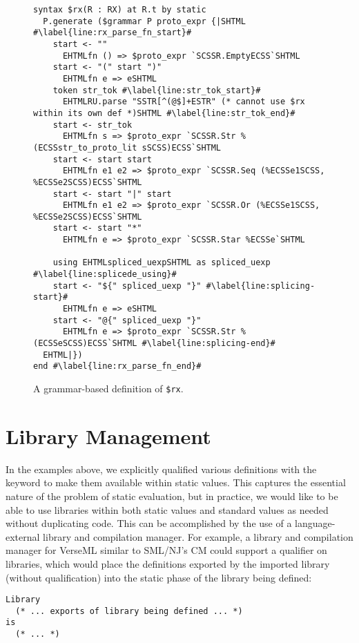 {\begin{figure}[h!]
\vspace{-5px}
\begin{lstlisting}[deletekeywords={as}]
syntax $rx(R : RX) at R.t by static 
  P.generate ($grammar P proto_expr {|SHTML #\label{line:rx_parse_fn_start}#
    start <- ""
      EHTMLfn () => $proto_expr `SCSSR.EmptyECSS`SHTML
    start <- "(" start ")"
      EHTMLfn e => eSHTML
    token str_tok #\label{line:str_tok_start}#
      EHTMLRU.parse "SSTR[^(@$]+ESTR" (* cannot use $rx within its own def *)SHTML #\label{line:str_tok_end}#
    start <- str_tok
      EHTMLfn s => $proto_expr `SCSSR.Str %(ECSSstr_to_proto_lit sSCSS)ECSS`SHTML
    start <- start start
      EHTMLfn e1 e2 => $proto_expr `SCSSR.Seq (%ECSSe1SCSS, %ECSSe2SCSS)ECSS`SHTML
    start <- start "|" start 
      EHTMLfn e1 e2 => $proto_expr `SCSSR.Or (%ECSSe1SCSS, %ECSSe2SCSS)ECSS`SHTML
    start <- start "*"
      EHTMLfn e => $proto_expr `SCSSR.Star %ECSSe`SHTML

    using EHTMLspliced_uexpSHTML as spliced_uexp #\label{line:splicede_using}#
    start <- "${" spliced_uexp "}" #\label{line:splicing-start}#
      EHTMLfn e => eSHTML
    start <- "@{" spliced_uexp "}"
      EHTMLfn e => $proto_expr `SCSSR.Str %(ECSSeSCSS)ECSS`SHTML #\label{line:splicing-end}#
  EHTML|})
end #\label{line:rx_parse_fn_end}#
\end{lstlisting}
\vspace{-12px}
\caption{A grammar-based definition of \texttt{\$rx}.}
\vspace{-15px}
\label{fig:rx-grammar-based}
\end{figure}


\section{Library Management}
In the examples above, we explicitly qualified various definitions with the  keyword to make them available within static values. This captures the essential nature of the problem of static evaluation, but in practice, we would like to be able to use libraries within both static values and standard values as needed without duplicating code. This can be accomplished by the use of a language-external library and compilation manager. For example, a library and compilation manager for VerseML similar to SML/NJ's CM \cite{blume:smlnj-cm} could support a  qualifier on libraries, which would place the definitions exported by the imported library (without qualification) into the static phase of the library being defined:
\begin{lstlisting}[numbers=none,morekeywords={Library,is}]
Library 
  (* ... exports of library being defined ... *)
is 
  (* ... *)


\end{lstlisting}}
